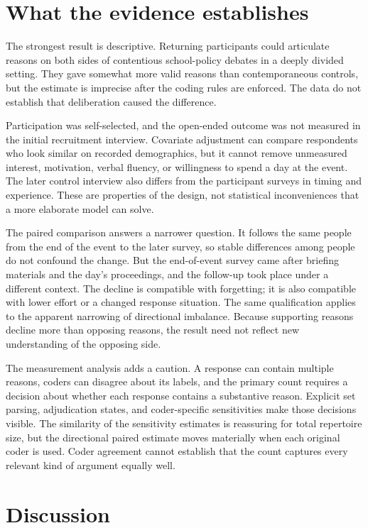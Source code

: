 \documentclass[11pt]{article}
\begin{document}
\section{What the evidence establishes}

The strongest result is descriptive. Returning participants could articulate reasons on both
sides of contentious school-policy debates in a deeply divided setting. They gave somewhat
more valid reasons than contemporaneous controls, but the estimate is imprecise after the
coding rules are enforced. The data do not establish that deliberation caused the difference.

Participation was self-selected, and the open-ended outcome was not measured in the initial
recruitment interview. Covariate
adjustment can compare respondents who look similar on recorded demographics, but it cannot
remove unmeasured interest, motivation, verbal fluency, or willingness to spend a day at the
event. The later control interview also differs from the participant surveys in timing and
experience. These are properties of the design, not statistical inconveniences that a more
elaborate model can solve.

The paired comparison answers a narrower question. It follows the same people from the end of
the event to the later survey, so stable differences among people do not confound the change.
But the end-of-event survey came after briefing materials and the day's proceedings, and the
follow-up took place under a different context. The decline is compatible with forgetting; it
is also compatible with lower effort or a changed response situation. The same qualification
applies to the apparent narrowing of directional imbalance. Because supporting reasons decline
more than opposing reasons, the result need not reflect new understanding of the opposing side.

The measurement analysis adds a caution. A response can contain multiple reasons, coders can
disagree about its labels, and the primary count requires a decision about whether each response
contains a substantive reason. Explicit set parsing, adjudication states, and coder-specific
sensitivities make those decisions visible. The similarity of the sensitivity estimates is
reassuring for total repertoire size, but the directional paired estimate moves materially when
each original coder is used. Coder agreement cannot establish that the count captures every
relevant kind of argument equally well.

\section{Discussion}
\end{document}
